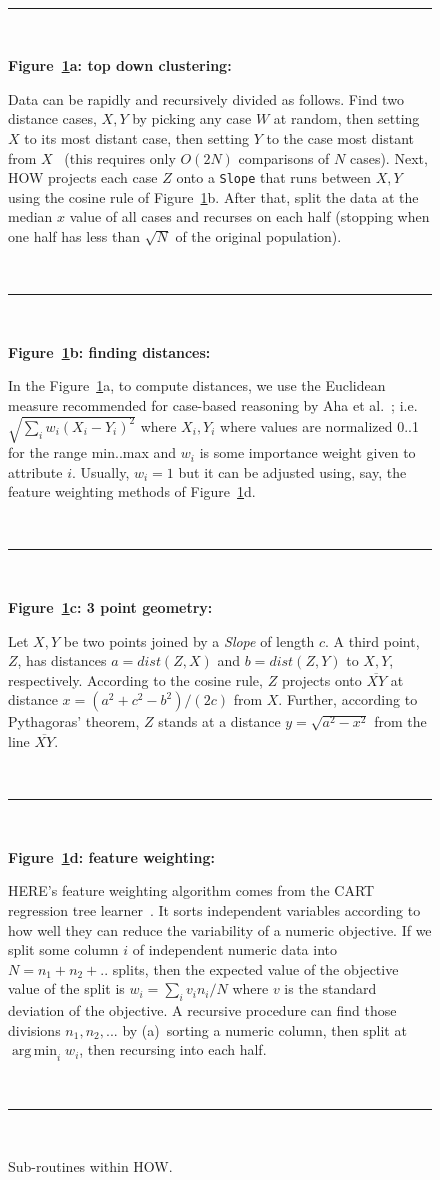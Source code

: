 \documentclass{sig-alternate}
\newcommand{\fig}[1]{Figure~\ref{fig:#1}}
\DeclareMathOperator*{\argmin}{arg\,min}
\begin{document}
\begin{figure}[t!]
	\small
	~\hrule~
	
	{\bf \fig{where}a: top down clustering:}
	
	Data can be rapidly and recursively divided   as follows.
	Find   two   distance cases,  $X,Y$
	by picking any case $W$ at random, then setting $X$ to its most
	distant case, then setting $Y$ to the case most distant from
	$X$~\cite{fastmap}
	(this requires only $O(2N)$ comparisons
	of $N$ cases).
	Next, HOW projects each case $Z$
	onto a {\tt Slope} that  runs between $X,Y$ using the cosine
	rule of \fig{where}b. After that,  split the data at the median $x$ value of all cases and
	recurses on each half  (stopping when
	one half has less  than $\sqrt{N}$ of the original population).
	
	~\hrule~
	
	{\bf \fig{where}b: finding distances:}
	
	In the \fig{where}a, to compute distances, we use
	the Euclidean measure recommended for
	case-based reasoning by Aha et al.~\cite{aha91};
	i.e. $\sqrt{\sum_iw_i(X_i-Y_i)^2}$ where $X_i,Y_i$
	where values are  normalized 0..1 for the range min..max and 
	$w_i$ is some importance weight given to attribute $i$.
	Usually, $w_i=1$ but it can be adjusted using, say,
	the feature weighting methods of \fig{where}d. 
	
	~\hrule~
	
	{\bf \fig{where}c: 3 point geometry:}
	
	Let   $X,Y$ be two points joined by  a {\em Slope} of  length $c$.
	A third point, $Z$, has distances  $a=dist(Z,X)$ and
	$b=dist(Z,Y)$ to $X,Y$, respectively.
	According to the cosine rule,   $Z$ projects onto  $\overline{XY}$
	at distance $x=(a^2 + c^2 - b^2)/(2c)$ from $X$.
	Further, according to Pythagoras' theorem, $Z$ stands at a distance
	$y = \sqrt{a^2 - x^2}$ from the line $\overline{XY}$. 
	
	~\hrule~
	
	{\bf \fig{where}d: feature weighting:}
	
	HERE's feature weighting algorithm
	comes from the CART regression tree learner~\cite{Breiman1984}.
	It sorts independent variables
	according to how well they can reduce the variability
	of a  numeric objective.
	If we split some column $i$ of independent numeric data  into $N=n_1 + n_2 + ..$ splits,
	then the expected
	value of the objective value of the split  is $w_i = \sum_i v_in_i/N$
	where $v$ is the standard deviation of the objective.
	A recursive procedure can  find those divisions $n_1,n_2,...$ by (a)~sorting a numeric column,
	then split at $\argmin_i w_i$, then recursing into each half.
	
	~\hrule~
	
	\caption{Sub-routines within HOW.}\label{fig:where}
\end{figure}
\end{document}
